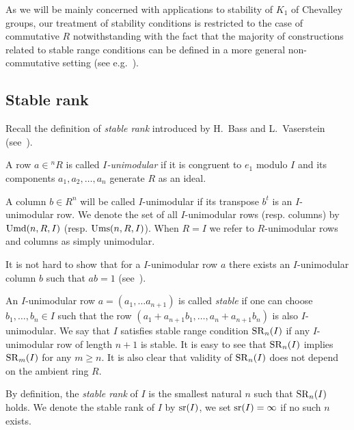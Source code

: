 As we will be mainly concerned with applications to stability of $K_1$ of Chevalley groups, our treatment of stability conditions is restricted to the case of commutative $R$
notwithstanding with the fact that the majority of constructions related to stable range conditions can be defined in a more general non-commutative setting (see e.g.~\cite{Ba64, Va69, Va71}).

\subsection{Stable rank}
Recall the definition of \emph{stable rank} introduced by H.~Bass and L.~Vaserstein (see~\cite{Ba64, Va69}).
\begin{dfn} A row $a\in{}^n\!R$ is called \emph{$I$-unimodular} if it is congruent to $e_1$ modulo $I$ and its components $a_1,a_2,\ldots,a_n$ generate $R$ as an ideal. \end{dfn}
A column $b \in R^n$ will be called $I$-unimodular if its transpose $b^t$ is an $I$-unimodular row.
We denote the set of all $I$-unimodular rows (resp. columns) by $\operatorname{Umd}(n,R,I)$ (resp. $\operatorname{Ums}(n,R,I)$).
When $R=I$ we refer to $R$-unimodular rows and columns as simply unimodular.

It is not hard to show that for a $I$-unimodular row $a$ there exists an $I$-unimodular column $b$ such that $ab=1$ (see~\cite[\S~2]{Va69}).

An $I$-unimodular row $a=(a_1,\ldots a_{n+1})$ is called \emph{stable} if one can choose $b_1,\ldots,b_n\in I$ such that the row $(a_1+a_{n+1}b_1,\ldots,a_n+a_{n+1}b_n)$ is also $I$-unimodular. 
We say that $I$ satisfies stable range condition $\operatorname{SR}_n(I)$ if any $I$-unimodular row of length $n+1$ is stable.
It is easy to see that $\operatorname{SR}_n(I)$ implies $\operatorname{SR}_m(I)$ for any $m\geqslant n$. It is also clear that validity of $\operatorname{SR}_n(I)$ does not depend on the ambient ring $R$.

By definition, the {\it stable rank} of $I$ is the smallest natural $n$ such that $\operatorname{SR}_n(I)$ holds.
We denote the stable rank of $I$ by $\operatorname{sr}(I)$, we set $\operatorname{sr}(I)=\infty$ if no such $n$ exists.


